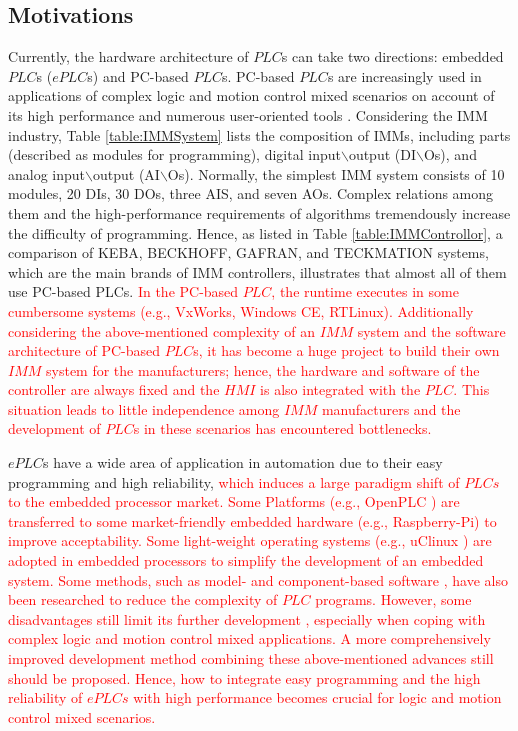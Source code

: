 \documentclass[journal,UTF8]{IEEEtran}
\begin{document}
	\subsection{Motivations}
	Currently, the hardware architecture of $PLC$s can take two directions: embedded $PLC$s ($ePLC$s) and PC-based $PLC$s. PC-based $PLC$s are increasingly used in applications of complex logic and motion control mixed scenarios on account of its high performance and numerous user-oriented tools \cite{Hossain2014Advanced}. Considering the IMM industry, Table \ref{table:IMMSystem} lists the composition of IMMs, including parts (described as modules for programming), digital input$\backslash$output (DI$\backslash$Os), and analog input$\backslash$output (AI$\backslash$Os). Normally, the simplest IMM system consists of 10 modules, 20 DIs, 30 DOs, three AIS, and seven AOs. Complex relations among them and the high-performance requirements of algorithms tremendously increase the difficulty of programming. Hence, as listed in Table \ref{table:IMMControllor}, a comparison of KEBA, BECKHOFF, GAFRAN, and TECKMATION systems, which are the main brands of IMM controllers, illustrates that almost all of them use PC-based PLCs. \textcolor{red}{In the PC-based $PLC$, the runtime executes in some cumbersome systems (e.g., VxWorks, Windows CE, RTLinux). Additionally considering the above-mentioned complexity of an $IMM$ system and the software architecture of PC-based $PLC$s, it has become a huge project to build their own $IMM$ system for the manufacturers; hence, the hardware and software of the controller are always fixed and the $HMI$ is also integrated with the $PLC$. This situation leads to little independence among $IMM$ manufacturers and the development of $PLC$s in these scenarios has encountered bottlenecks.}

	

	$ePLC$s have a wide area of application in automation due to their easy programming and high reliability, \textcolor{red}{which induces a large paradigm shift of $PLCs$ to the embedded processor market. Some Platforms (e.g., OpenPLC \cite{alves2014openplc}) are transferred to some market-friendly embedded hardware (e.g., Raspberry-Pi) to improve acceptability. Some light-weight operating systems (e.g., uClinux \cite{gaur2015operating}) are adopted in embedded processors to simplify the development of an embedded system. Some methods, such as model- and component-based software \cite{Bonf2013Design, Vyatkin2013Software}, have also been researched to reduce the complexity of $PLC$ programs.
	However, some disadvantages still limit its further development \cite{Hossain2014Advanced}, especially when coping with complex logic and motion control mixed applications. A more comprehensively improved development method combining these above-mentioned advances still should be proposed. Hence, how to integrate easy programming and the high reliability of $ePLCs$ with high performance becomes crucial for logic and motion control mixed scenarios.}
	
\end{document}
